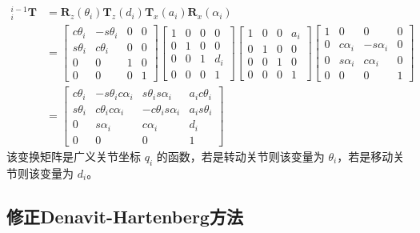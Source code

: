\documentclass[cn,11pt,chinese,blue,bibstyle=ieeetr]{elegantbook}
\begin{document}
\begin{equation}\label{sdh_model_adjacent_link_forward_coordinate_transformation}
	\begin{aligned}
		{_i^{i-1}\bm{T}} &= \bm{R}_z\left(\theta_i\right)\bm{T}_z\left(d_i\right)\bm{T}_x\left(a_i\right)\bm{R}_x\left(\alpha_i\right) \\
		&= 
		\begin{bmatrix}
			c\theta_i & -s\theta_i & 0 & 0 \\
			s\theta_i & c\theta_i  & 0 & 0 \\
			0         & 0          & 1 & 0 \\
			0         & 0          & 0 & 1
		\end{bmatrix}
		\begin{bmatrix}
			1 & 0 & 0 & 0   \\
			0 & 1 & 0 & 0   \\
			0 & 0 & 1 & d_i \\
			0 & 0 & 0 & 1
		\end{bmatrix}
		\begin{bmatrix}
			1 & 0 & 0 & a_i \\
			0 & 1 & 0 & 0   \\
			0 & 0 & 1 & 0   \\
			0 & 0 & 0 & 1
		\end{bmatrix}
		\begin{bmatrix}
			1 & 0 		  & 0          & 0 \\
			0 & c\alpha_i & -s\alpha_i & 0 \\
			0 & s\alpha_i & c\alpha_i  & 0 \\
			0 & 0         & 0          & 1
		\end{bmatrix} \\
		&= \begin{bmatrix}
			c\theta_i & -s\theta_i c\alpha_i & s\theta_i s\alpha_i  & a_i c\theta_i \\
			s\theta_i & c\theta_i c\alpha_i  & -c\theta_i s\alpha_i & a_i s\theta_i \\
			0         & s\alpha_i            & c\alpha_i            & d_i           \\
			0         & 0                    & 0                    & 1
		\end{bmatrix}
	\end{aligned}
\end{equation}
该变换矩阵是广义关节坐标 $q_i$ 的函数，若是转动关节则该变量为 $\theta_i$，若是移动关节则该变量为 $d_i$。

\subsection{修正Denavit-Hartenberg方法}
\end{document}
